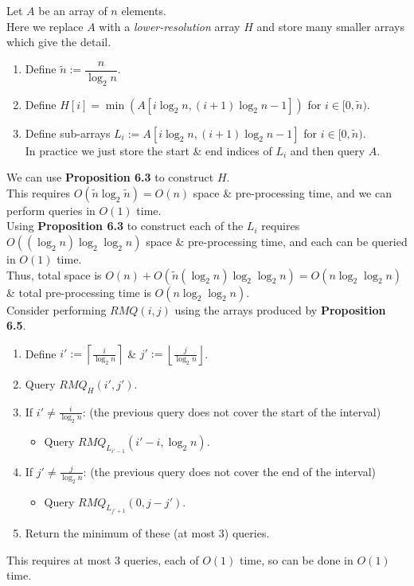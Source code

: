 \documentclass[11pt,a4paper]{article}
\begin{document}
Let $A$ be an array of $n$ elements.\\
Here we replace $A$ with a \textit{lower-resolution} array $H$ and store many smaller arrays which give the detail.
\begin{enumerate}
	\item Define $\tilde{n}:=\dfrac{n}{\log_2n}$.
	\item Define $H[i]=\min(A[i\log_2n,(i+1)\log_2n-1])$ for $i\in[0,\tilde{n})$.
	\item Define sub-arrays $L_i:=A[i\log_2n,(i+1)\log_2n-1]$ for $i\in[0,\tilde{n})$.\\
	\nb In practice we just store the start \& end indices of $L_i$ and then query $A$.
\end{enumerate}
We can use \textbf{Proposition 6.3} to construct $H$.\\
This requires $O(\tilde{n}\log_2\tilde{n})=O(n)$ space \& pre-processing time, and we can perform queries in $O(1)$ time.\\
Using \textbf{Proposition 6.3} to construct each of the $L_i$ requires $O((\log_2n)\log_2\log_2n)$ space \& pre-processing time, and each can be queried in $O(1)$ time.\\
Thus, total space is $O(n)+O(\tilde{n}(\log_2n)\log_2\log_2n)=O(n\log_2\log_2n)$ \& total pre-processing time is $O(n\log_2\log_2n)$.\\

Consider performing $RMQ(i,j)$ using the arrays produced by \textbf{Proposition 6.5}.
\begin{enumerate}
	\item Define $i':=\left\lceil\frac{i}{\log_2n}\right\rceil$ \& $j':=\left\lfloor\frac{j}{\log_2n}\right\rfloor$.
	\item Query $RMQ_H(i',j')$.
	\item If $i'\neq\frac{i}{\log_2n}$: (\ie the previous query does not cover the start of the interval)
	\begin{itemize}
		\item Query $RMQ_{L_{i'-1}}(i'-i,\log_2n)$.
	\end{itemize}
	\item If $j'\neq\frac{j}{\log_2n}$: (\ie the previous query does not cover the end of the interval)
	\begin{itemize}
		\item Query $RMQ_{L_{j'+1}}(0,j-j')$.
	\end{itemize}
	\item Return the minimum of these (at most 3) queries.
\end{enumerate}
This requires at most 3 queries, each of $O(1)$ time, so can be done in $O(1)$ time.
\end{document}
